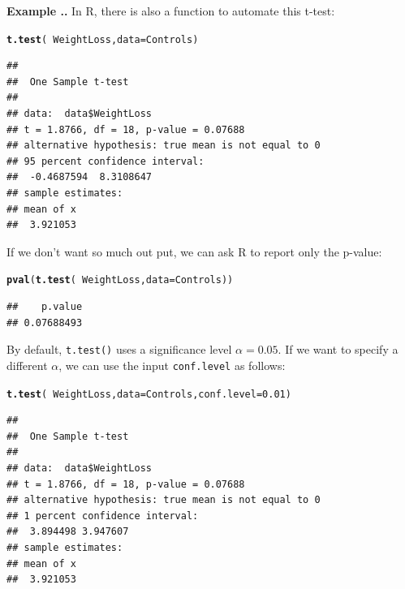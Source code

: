 \documentclass[twoside]{book}\usepackage[]{graphicx}\usepackage[]{xcolor}
\makeatletter
\newcommand{\hlnum}[1]{\textcolor[rgb]{0.686,0.059,0.569}{#1}}%
\newcommand{\hlopt}[1]{\textcolor[rgb]{0,0,0}{#1}}%
\newcommand{\hlstd}[1]{\textcolor[rgb]{0.345,0.345,0.345}{#1}}%
\newcommand{\hlkwc}[1]{\textcolor[rgb]{0.333,0.667,0.333}{#1}}%
\newcommand{\hlkwd}[1]{\textcolor[rgb]{0.737,0.353,0.396}{\textbf{#1}}}%
\newenvironment{kframe}{%
 \def\at@end@of@kframe{}%
 \ifinner\ifhmode%
  \def\at@end@of@kframe{\end{minipage}}%
  \begin{minipage}{\columnwidth}%
 \fi\fi%
 \def\FrameCommand##1{\hskip\@totalleftmargin \hskip-\fboxsep
 \colorbox{shadecolor}{##1}\hskip-\fboxsep
     \hskip-\linewidth \hskip-\@totalleftmargin \hskip\columnwidth}%
 \MakeFramed {\advance\hsize-\width
   \@totalleftmargin\z@ \linewidth\hsize
   \@setminipage}}%
 {\par\unskip\endMakeFramed%
 \at@end@of@kframe}
\newenvironment{knitrout}{}{} %
\newcounter{example}[section]
\newenvironment{example}%
{\refstepcounter{example}%
\textbf{Example \thesection.\arabic{example}. }}%
{}
\makeatother
\begin{document}
\begin{example}
In R, there is also a function to automate this t-test:
\begin{knitrout}
\color{fgcolor}\begin{kframe}
\begin{alltt}
\hlkwd{t.test}\hlstd{(}\hlopt{~}\hlstd{WeightLoss,} \hlkwc{data} \hlstd{= Controls)}
\end{alltt}
\begin{verbatim}
## 
## 	One Sample t-test
## 
## data:  data$WeightLoss
## t = 1.8766, df = 18, p-value = 0.07688
## alternative hypothesis: true mean is not equal to 0
## 95 percent confidence interval:
##  -0.4687594  8.3108647
## sample estimates:
## mean of x 
##  3.921053
\end{verbatim}
\end{kframe}
\end{knitrout}
	If we don't want so much out put, we can ask R to report only the p-value:
\begin{knitrout}
\color{fgcolor}\begin{kframe}
\begin{alltt}
\hlkwd{pval}\hlstd{(}\hlkwd{t.test}\hlstd{(}\hlopt{~}\hlstd{WeightLoss,} \hlkwc{data} \hlstd{= Controls))}
\end{alltt}
\begin{verbatim}
##    p.value 
## 0.07688493
\end{verbatim}
\end{kframe}
\end{knitrout}
By default, \texttt{t.test()} uses a significance level $\alpha = 0.05$. If we want to specify a different $\alpha$, we can use the input \texttt{conf.level} as follows:
\begin{knitrout}
\color{fgcolor}\begin{kframe}
\begin{alltt}
\hlkwd{t.test}\hlstd{(}\hlopt{~}\hlstd{WeightLoss,} \hlkwc{data} \hlstd{= Controls,} \hlkwc{conf.level} \hlstd{=} \hlnum{0.01}\hlstd{)}
\end{alltt}
\begin{verbatim}
## 
## 	One Sample t-test
## 
## data:  data$WeightLoss
## t = 1.8766, df = 18, p-value = 0.07688
## alternative hypothesis: true mean is not equal to 0
## 1 percent confidence interval:
##  3.894498 3.947607
## sample estimates:
## mean of x 
##  3.921053
\end{verbatim}
\end{kframe}
\end{knitrout}
\end{example}
\end{document}
